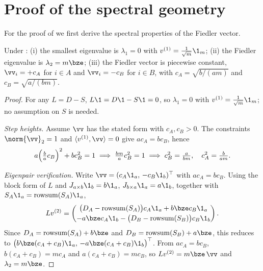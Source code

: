 \section{Proof of the spectral geometry}\label{app:comp1}

For the proof of  we first derive the spectral properties of the
Fiedler vector.

\begin{lemma}\label{lem:A-decomp}
Under : (i) the smallest eigenvalue is $\lambda_1=0$ with
$v^{(1)}=\tfrac1{\sqrt m}\1_m$; (ii) the Fiedler eigenvalue is $\lambda_2=m\bze$;
(iii) the Fiedler vector is piecewise constant, $\vv_i=+c_A$ for $i\in A$ and
$\vv_i=-c_B$ for $i\in B$, with $c_A=\sqrt{b/(am)}$ and $c_B=\sqrt{a/(bm)}$.
\end{lemma}
\begin{proof}
For any $L=D-S$, $L\1=D\1-S\1=0$, so $\lambda_1=0$ with $v^{(1)}=\tfrac1{\sqrt
m}\1_m$; no assumption on $S$ is needed.

\emph{Step heights.} Assume $\vv$ has the stated form with $c_A,c_B>0$. The
constraints $\norm{\vv}_2=1$ and $\langle v^{(1)},\vv\rangle=0$ give $ac_A=bc_B$,
hence
\[
   a\Bigl(\tfrac{b}{a}c_B\Bigr)^2+bc_B^2=1
   \;\Longrightarrow\;\tfrac{bm}{a}c_B^2=1
   \;\Longrightarrow\; c_B^2=\tfrac{a}{bm},\quad c_A^2=\tfrac{b}{am}.
\]

\emph{Eigenpair verification.} Write $\vv=(c_A\1_a,\,-c_B\1_b)^\top$ with
$ac_A=bc_B$. Using the block form of $L$ and $J_{a\times b}\1_b=b\1_a$,
$J_{b\times a}\1_a=a\1_b$, together with $S_A\1_a=\operatorname{rowsum}(S_A)\1_a$,
\[
   Lv^{(2)}=
   \begin{pmatrix}
     \bigl(D_A-\operatorname{rowsum}(S_A)\bigr)c_A\1_a+b\bze c_B\1_a\\[2pt]
     -a\bze c_A\1_b-\bigl(D_B-\operatorname{rowsum}(S_B)\bigr)c_B\1_b
   \end{pmatrix}.
\]
Since $D_A=\operatorname{rowsum}(S_A)+b\bze$ and
$D_B=\operatorname{rowsum}(S_B)+a\bze$, this reduces to
$\bigl(b\bze(c_A+c_B)\1_a,\,-a\bze(c_A+c_B)\1_b\bigr)^\top$. From $ac_A=bc_B$,
$b(c_A+c_B)=mc_A$ and $a(c_A+c_B)=mc_B$, so $Lv^{(2)}=m\bze\,\vv$ and
$\lambda_2=m\bze$.
\end{proof}

